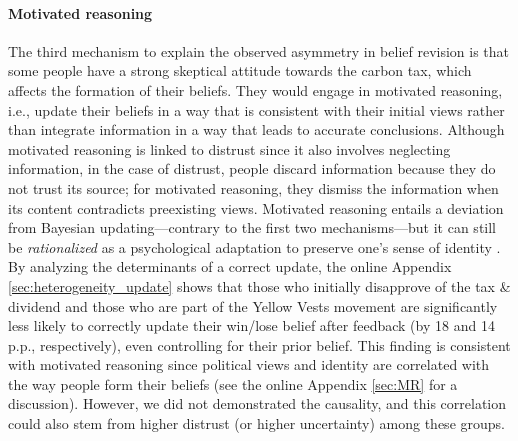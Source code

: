 \documentclass[12pt]{article} %
\begin{document}


\paragraph{Motivated reasoning}


The third mechanism to explain the observed asymmetry in belief revision is that some people have a strong skeptical attitude towards the carbon tax, which affects the formation of their beliefs. They would engage in motivated reasoning, i.e., update their beliefs in a way that is consistent with their initial views \citep{druckman_evidence_2019,little_distortion_2019} rather than integrate information in a way that leads to accurate conclusions. Although motivated reasoning is linked to distrust since it also involves neglecting information, in the case of distrust, people discard information because they do not trust its source; for motivated reasoning, they dismiss the information when its content contradicts preexisting views. Motivated reasoning entails a deviation from Bayesian updating---contrary to the first two mechanisms---but it can still be \textit{rationalized} as a psychological adaptation to preserve one's sense of identity \citep{kahan_ideology_2013}. By analyzing the determinants of a correct update, the online Appendix \ref{sec:heterogeneity_update} shows that those who initially disapprove of the tax \& dividend and those who are part of the Yellow Vests movement are significantly less likely to correctly update their win/lose belief after feedback (by 18 and 14 p.p., respectively), even controlling for their prior belief. This finding is consistent with motivated reasoning since political views and identity are correlated with the way people form their beliefs (see the online Appendix \ref{sec:MR} for a discussion). However, we did not demonstrated the causality, and this correlation could also stem from higher distrust (or higher uncertainty) among these groups.

\end{document}
